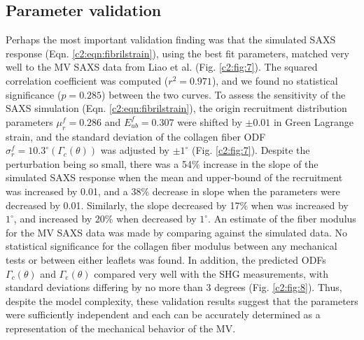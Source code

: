     


\subsection{Parameter validation} \label{c2:sec:233}

    Perhaps the most important validation finding was that the simulated SAXS response (Eqn. \ref{c2:eqn:fibrilstrain}), using the best fit parameters, matched very well to the MV SAXS data from Liao et al. \cite{liao_relation_2007} (Fig. \ref{c2:fig:7}). The squared correlation coefficient was computed ($r^2 = 0.971$), and we found no statistical significance ($p = 0.285$) between the two curves. To assess the sensitivity of the SAXS simulation (Eqn. \ref{c2:eqn:fibrilstrain}), the origin recruitment distribution parameters $\mu_r^f = 0.286$ and $E_{ub}^f = 0.307 $ were shifted by $\pm0.01$ in Green Lagrange strain, and the standard deviation of the collagen fiber ODF $\sigma_r^f = 10.3^\circ (\Gamma_c(\theta))$ was adjusted by $\pm1^\circ$ (Fig. \ref{c2:fig:7}). Despite the perturbation being so small, there was a 54\% increase in the slope of the simulated SAXS response when the mean and upper-bound of the recruitment was increased by 0.01, and a 38\% decrease in slope when the parameters were decreased by 0.01. Similarly, the slope decreased by 17\% when  was increased by $1^\circ$, and increased by 20\% when decreased by $1^\circ$. 
    An estimate of the fiber modulus for the MV SAXS data was made by comparing against the simulated data. No statistical significance for the collagen fiber modulus between any mechanical tests or between either leaflets was found. In addition, the predicted ODFs $\Gamma_c(\theta)$ and $\Gamma_e(\theta)$ compared very well with the SHG measurements, with standard deviations differing by no more than 3 degrees (Fig. \ref{c2:fig:8}). Thus, despite the model complexity, these validation results suggest that the parameters were sufficiently independent and each can be accurately determined as a representation of the mechanical behavior of the MV.
    
